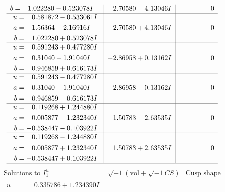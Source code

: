 \documentclass[1p]{elsarticle_modified}
\theoremstyle{definition}
\newcommand{\I}{\sqrt{-1}}
\begin{document}
$$\begin{array}{c|c|c}
\begin{aligned}
b &= \phantom{-}1.022280 - 0.523078 I\end{aligned}
 & -2.70580 - 4.13046 I & \phantom{-0.000000 } 0 \\ \hline\begin{aligned}
u &= \phantom{-}0.581872 - 0.533061 I \\
a &= -1.56364 + 2.16916 I \\
b &= \phantom{-}1.022280 + 0.523078 I\end{aligned}
 & -2.70580 + 4.13046 I & \phantom{-0.000000 } 0 \\ \hline\begin{aligned}
u &= \phantom{-}0.591243 + 0.477280 I \\
a &= \phantom{-}0.31040 + 1.91040 I \\
b &= \phantom{-}0.946859 + 0.616173 I\end{aligned}
 & -2.86958 + 0.13162 I & \phantom{-0.000000 } 0 \\ \hline\begin{aligned}
u &= \phantom{-}0.591243 - 0.477280 I \\
a &= \phantom{-}0.31040 - 1.91040 I \\
b &= \phantom{-}0.946859 - 0.616173 I\end{aligned}
 & -2.86958 - 0.13162 I & \phantom{-0.000000 } 0 \\ \hline\begin{aligned}
u &= \phantom{-}0.119268 + 1.244880 I \\
a &= \phantom{-}0.005877 - 1.232340 I \\
b &= -0.538447 - 0.103922 I\end{aligned}
 & \phantom{-}1.50783 - 2.63535 I & \phantom{-0.000000 } 0 \\ \hline\begin{aligned}
u &= \phantom{-}0.119268 - 1.244880 I \\
a &= \phantom{-}0.005877 + 1.232340 I \\
b &= -0.538447 + 0.103922 I\end{aligned}
 & \phantom{-}1.50783 + 2.63535 I & \phantom{-0.000000 } 0\\
 \hline 
 \end{array}$$\newpage$$\begin{array}{c|c|c}  
\text{Solutions to }I^u_{1}& \I (\text{vol} + \sqrt{-1}CS) & \text{Cusp shape}\\
 \hline 
\begin{aligned}
u &= \phantom{-}0.335786 + 1.234390 I \\

\end{aligned}
\end{array}$$
\end{document}
